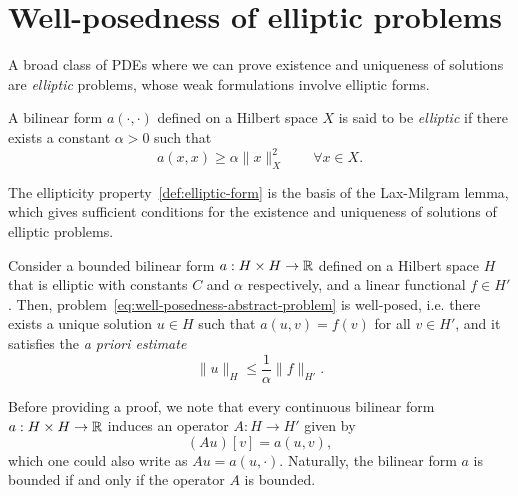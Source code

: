 \section{Well-posedness of elliptic problems}
A broad class of PDEs where we can prove existence and uniqueness of solutions are \emph{elliptic} problems, whose weak formulations involve elliptic forms. 
\begin{definition}\label{def:elliptic-form}
    A bilinear form $a(\cdot, \cdot)$ defined on a Hilbert space $X$ is said to be \emph{elliptic} if there exists a constant $\alpha>0$ such that
    \begin{equation}\label{eq:elliptic-form}
        a(x, x) \geq \alpha \| x \|^2_X \qquad \forall x\in X.
    \end{equation}
\end{definition}

The ellipticity property~\ref{def:elliptic-form} is the basis of the Lax-Milgram lemma, which gives sufficient conditions for the existence and uniqueness of solutions of elliptic problems.
\begin{lemma}\label{lemma:lax-milgram}
    Consider a bounded bilinear form $a: H\times H\to \mathbb{R}$ defined on a Hilbert space $H$ that is elliptic with constants $C$ and $\alpha$ respectively, and a linear functional $f\in H'$. Then, problem~\ref{eq:well-posedness-abstract-problem} is well-posed, i.e. there exists a unique solution $u\in H$ such that $a(u,v)=f(v)$ for all $v\in H'$, and it satisfies the \emph{a priori estimate}
    \begin{equation}\label{eq:lax-milgram-a-priori}
        \| u\|_H \leq \frac 1 \alpha \| f \|_{H'} .
    \end{equation}
\end{lemma}

Before providing a proof, we note that every continuous bilinear form $a:H\times H\to \mathbb{R}$ induces an operator $A:H\to H'$ given by
\begin{equation}\label{eq:form-induced-by-matrix}
    (Au)[v] = a(u,v),
\end{equation}
which one could also write as $Au = a(u, \cdot)$. Naturally, the bilinear form $a$ is bounded if and only if the operator $A$ is bounded. 

